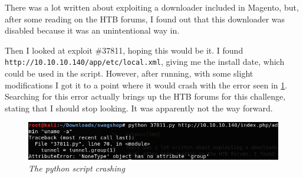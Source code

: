 There was a lot written about exploiting a downloader included in Magento, but, after some reading on the HTB forums, I found out that this downloader was disabled because it was an unintentional way in.

Then I looked at exploit \#37811, hoping this would be it. I found\\ \verb|http://10.10.10.140/app/etc/local.xml|, giving me the install date, which could be used in the script. However, after running, with some slight modifications I got it to a point where it would crash with the error seen in \cref{fig:37811.py}. Searching for this error actually brings up the HTB forums for this challenge, stating that I should stop looking. It was apparently not the way forward.

\begin{figure}
	\centering
	\captionsetup{justification=centering}
	\noindent \includegraphics[width=\textwidth]{figures/python-37811-tunnel-error.png}
	\caption{\emph{The python script crashing}}
	\label{fig:37811.py}
\end{figure}